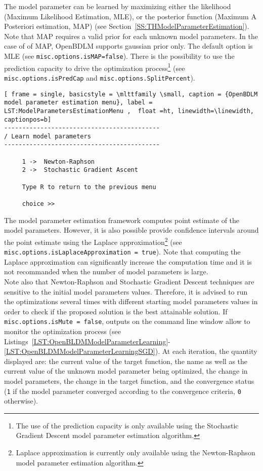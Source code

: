 The model parameter can be learned by maximizing either the likelihood (Maximum Likelihood Estimation, MLE), or the posterior function (Maximum A Posteriori estimation, MAP) (see Section~\ref{SS:THModelParameterEstimation}). 
Note that MAP requires a valid prior for each unknown model parameters.
In the case of of MAP, OpenBDLM supports gaussian prior only.
The default option is MLE (see \lstinline[basicstyle = \mlttfamily \small ]!misc.options.isMAP=false!).
There is the possibility to use the prediction capacity to drive the optimization process\footnote{The use of the prediction capacity is only available using the Stochastic Gradient Descent model parameter estimation algorithm.} (see  \lstinline[basicstyle = \mlttfamily \small ]!misc.options.isPredCap! and \lstinline[basicstyle = \mlttfamily \small ]!misc.options.SplitPercent!).
\begin{lstlisting}[ frame = single, basicstyle = \mlttfamily \small, caption = {OpenBDLM model parameter estimation menu}, label = LST:ModelParametersEstimationMenu ,  float =ht, linewidth=\linewidth, captionpos=b]
-------------------------------------------
/ Learn model parameters
-------------------------------------------

     1 ->  Newton-Raphson
     2 ->  Stochastic Gradient Ascent

     Type R to return to the previous menu

     choice >> 
\end{lstlisting}
The model parameter estimation framework computes point estimate of the model parameters. 
However, it is also possible provide confidence intervals around the point estimate using the Laplace approximation\footnote{Laplace approximation is currently only available using the Newton-Raphson model parameter estimation algorithm.} (see \lstinline[basicstyle = \mlttfamily \small ]!misc.options.isLaplaceApproximation = true!).
Note that computing the Laplace approximation can significantly increase the computation time and it is not recommanded when the number of model parameters is large.\\

Note also that Newton-Raphson and Stochastic Gradient Descent techniques are sensitive to the initial model parameters values. 
Therefore, it is advised to run the optimizations several times with different starting model parameters values in order to check if the proposed solution is the best attainable solution.
If \lstinline[basicstyle = \mlttfamily \small ]!misc.options.isMute = false!, outputs on the \MATLAB{} command line window allow to monitor the optimization process (see Listings~\ref{LST:OpenBLDMModelParameterLearning}-\ref{LST:OpenBLDMModelParameterLearningSGD}).
At each iteration, the quantity displayed are: the current value of the target function, the name as well as the current value of the unknown model parameter being optimized, the change in model parameters, the change in the target function, and the convergence status (\lstinline[basicstyle = \mlttfamily \small ]!1! if the model parameter converged according to the convergence criteria, \lstinline[basicstyle = \mlttfamily \small ]!0! otherwise).\\

